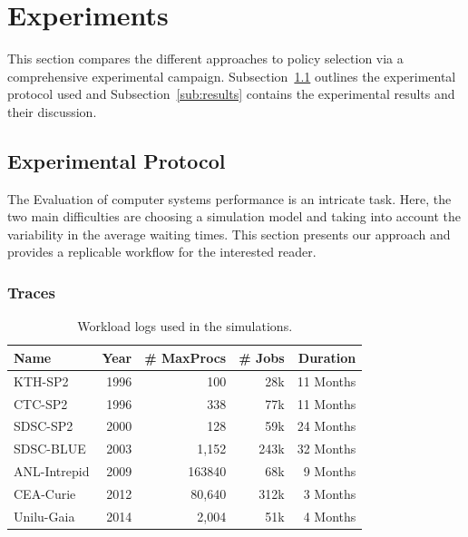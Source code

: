 \documentclass[sigconf]{acmart}
\newcommand{\ra}[1]{\renewcommand{\arraystretch}{#1}}
\begin{document}
\section{Experiments}
\label{sec:experiments}

This section compares the different approaches to policy selection via a
comprehensive experimental campaign.  Subsection~\ref{sub:protocol} outlines
the experimental protocol used and Subsection~\ref{sub:results} contains the
experimental results and their discussion.

\subsection{Experimental Protocol}
\label{sub:protocol}

The Evaluation of computer systems performance is an intricate
task\cite{feitbook}. Here, the two main difficulties are choosing a simulation
model and taking into account the variability in the average waiting times.
This section presents our approach and provides a replicable workflow
for the interested reader.

\subsubsection{Traces}
\label{sub:traces}

\begin{table}[ht]
  \centering
  \ra{1.3}
  \caption{Workload logs used in the simulations.}
  \label{tab:logs}
  \begin{tabular}{@{}lrrrr@{}}
    \hline
    Name          & Year & \# MaxProcs & \# Jobs & Duration\\
    \hline
    KTH-SP2       & 1996 & 100         & 28k     & 11 Months\\
    CTC-SP2       & 1996 & 338         & 77k     & 11 Months\\
    SDSC-SP2      & 2000 & 128         & 59k     & 24 Months\\
    SDSC-BLUE     & 2003 & 1,152       & 243k    & 32 Months\\
    ANL-Intrepid  & 2009 & 163840      & 68k     & 9  Months\\
    CEA-Curie     & 2012 & 80,640      & 312k    & 3  Months\\
    Unilu-Gaia    & 2014 & 2,004        & 51k     & 4  Months\\
    \hline
  \end{tabular}
\end{table}
\end{document}
